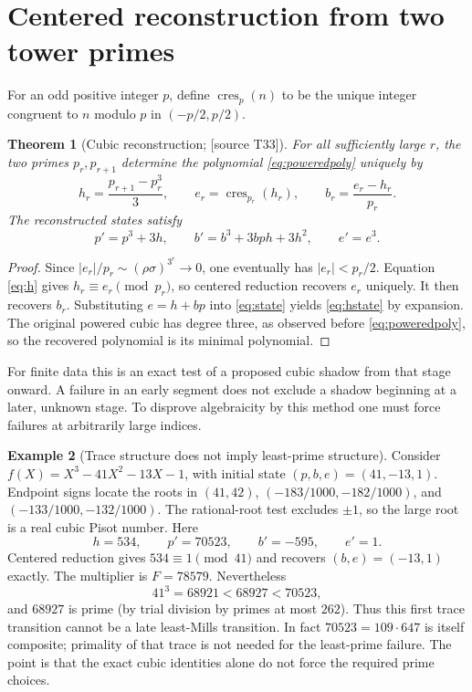 \documentclass[11pt,a4paper]{article}
\newtheorem{theorem}{Theorem}[section]
\theoremstyle{definition}\newtheorem{definition}[theorem]{Definition}
\newtheorem{example}[theorem]{Example}
\theoremstyle{remark}\newtheorem{remark}[theorem]{Remark}
\newcommand{\sourceT}[1]{\textup{[source T#1]}}
\begin{document}
\section{Centered reconstruction from two tower primes}
For an odd positive integer $p$, define $\operatorname{cres}_p(n)$ to be the unique integer congruent to $n$ modulo $p$ in $(-p/2,p/2)$.
\begin{theorem}[Cubic reconstruction; \sourceT{33}]\label{thm:reconstruct}
For all sufficiently large $r$, the two primes $p_r,p_{r+1}$ determine the polynomial \eqref{eq:poweredpoly} uniquely by
\begin{equation}\label{eq:reconstruct}
 h_r=\frac{p_{r+1}-p_r^3}{3},\qquad
 e_r=\operatorname{cres}_{p_r}(h_r),\qquad
 b_r=\frac{e_r-h_r}{p_r}.
\end{equation}
The reconstructed states satisfy
\begin{equation}\label{eq:hstate}
 p'=p^3+3h,\qquad b'=b^3+3bph+3h^2,\qquad e'=e^3.
\end{equation}
\end{theorem}
\begin{proof}
Since $|e_r|/p_r\sim(\rho\sigma)^{3^r}\to0$, one eventually has $|e_r|<p_r/2$. Equation \eqref{eq:h} gives $h_r\equiv e_r\pmod{p_r}$, so centered reduction recovers $e_r$ uniquely. It then recovers $b_r$. Substituting $e=h+bp$ into \eqref{eq:state} yields \eqref{eq:hstate} by expansion. The original powered cubic has degree three, as observed before \eqref{eq:poweredpoly}, so the recovered polynomial is its minimal polynomial.
\end{proof}
For finite data this is an exact test of a proposed cubic shadow from that stage onward. A failure in an early segment does not exclude a shadow beginning at a later, unknown stage. To disprove algebraicity by this method one must force failures at arbitrarily large indices.

\begin{example}[Trace structure does not imply least-prime structure]
Consider $f(X)=X^3-41X^2-13X-1$, with initial state $(p,b,e)=(41,-13,1)$. Endpoint signs locate the roots in $(41,42)$, $(-183/1000,-182/1000)$, and $(-133/1000,-132/1000)$. The rational-root test excludes $\pm1$, so the large root is a real cubic Pisot number. Here
\[
 h=534,\qquad p'=70523,\qquad b'=-595,\qquad e'=1.
\]
Centered reduction gives $534\equiv1\pmod{41}$ and recovers $(b,e)=(-13,1)$ exactly. The multiplier is $F=78579$. Nevertheless
\[
 41^3=68921<68927<70523,
\]
and $68927$ is prime (by trial division by primes at most $262$). Thus this first trace transition cannot be a late least-Mills transition. In fact $70523=109\cdot647$ is itself composite; primality of that trace is not needed for the least-prime failure. The point is that the exact cubic identities alone do not force the required prime choices.
\end{example}
\end{document}
